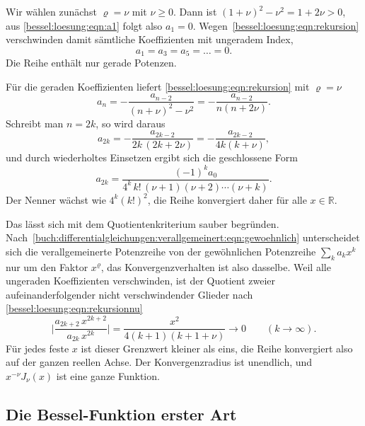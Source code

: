 Wir wählen zunächst $\varrho=\nu$ mit $\nu\ge 0$.
Dann ist $(1+\nu)^2-\nu^2 = 1+2\nu > 0$, aus \eqref{bessel:loesung:eqn:a1} folgt also $a_1=0$.
Wegen~\eqref{bessel:loesung:eqn:rekursion} verschwinden damit sämtliche Koeffizienten mit ungeradem Index,
\begin{equation}
a_1 = a_3 = a_5 = \dots = 0.
\label{bessel:loesung:eqn:ungerade}
\end{equation}
Die Reihe enthält nur gerade Potenzen.
 
Für die geraden Koeffizienten liefert \eqref{bessel:loesung:eqn:rekursion} mit $\varrho=\nu$
\begin{equation}
a_n
=
-\frac{a_{n-2}}{(n+\nu)^2-\nu^2}
=
-\frac{a_{n-2}}{n(n+2\nu)}.
\label{bessel:loesung:eqn:rekursionnu}
\end{equation}
Schreibt man $n=2k$, so wird daraus
\[
a_{2k}
=
-\frac{a_{2k-2}}{2k\,(2k+2\nu)}
=
-\frac{a_{2k-2}}{4k(k+\nu)},
\]
und durch wiederholtes Einsetzen ergibt sich die geschlossene Form
\begin{equation}
a_{2k}
=
\frac{(-1)^k a_0}{4^k\, k!\,(\nu+1)(\nu+2)\cdots(\nu+k)}.
\label{bessel:loesung:eqn:a2k}
\end{equation}
Der Nenner wächst wie $4^k(k!)^2$, die Reihe konvergiert daher für alle $x\in\mathbb{R}$.

Das lässt sich mit dem Quotientenkriterium sauber begründen.
Nach~\eqref{buch:differentialgleichungen:verallgemeinert:eqn:gewoehnlich} unterscheidet sich die verallgemeinerte Potenzreihe von der
gewöhnlichen Potenzreihe $\sum_k a_kx^k$ nur um den Faktor $x^{\varrho}$, das Konvergenzverhalten ist also dasselbe.
Weil alle ungeraden Koeffizienten verschwinden, ist der Quotient zweier aufeinanderfolgender nicht verschwindender Glieder nach
\eqref{bessel:loesung:eqn:rekursionnu}
\[
\biggl|
\frac{a_{2k+2}\,x^{2k+2}}{a_{2k}\,x^{2k}}
\biggr|
=
\frac{x^2}{4(k+1)(k+1+\nu)}
\longrightarrow
0
\qquad (k\to\infty).
\]
Für jedes feste $x$ ist dieser Grenzwert kleiner als eins, die Reihe konvergiert also auf der ganzen reellen Achse.
Der Konvergenzradius ist unendlich, und $x^{-\nu}J_\nu(x)$ ist eine ganze Funktion.
 
%
%
\subsection{Die Bessel-Funktion erster Art
\label{bessel:loesung:subsection:jnu}}

